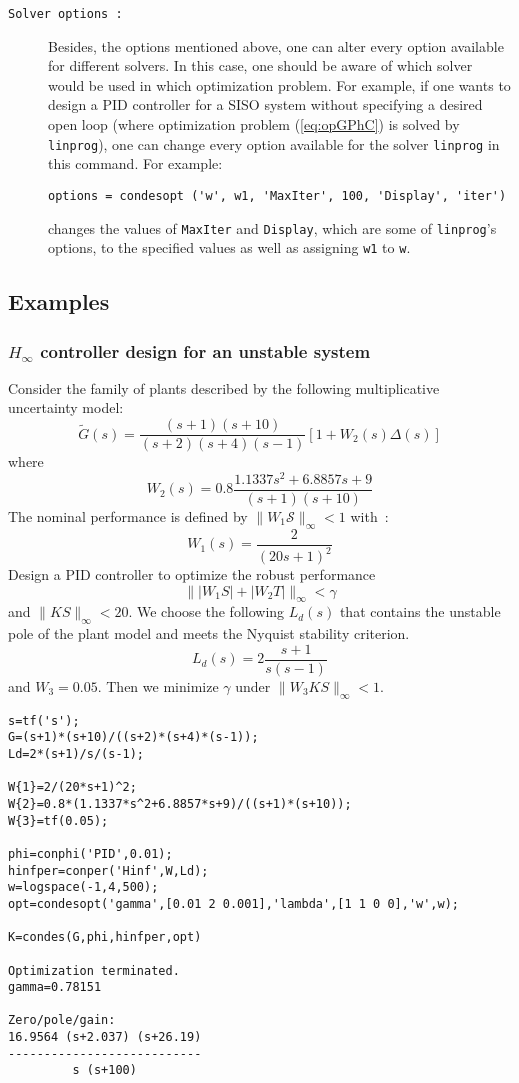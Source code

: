 \documentclass [12pt , a4paper] {report}
\begin{document}
\begin{description}
\item[\texttt{Solver options :}] Besides, the options mentioned above, one can alter every option available for different solvers. In this case, one should be aware of which solver would be used in which optimization problem. For example, if one wants to design a PID controller for a SISO system without specifying a desired open loop (where optimization problem (\ref{eq:opGPhC}) is solved by \texttt{linprog}), one can change every option available for the solver \texttt{linprog} in this command. For example:
\begin{lstlisting}
options = condesopt ('w', w1, 'MaxIter', 100, 'Display', 'iter')
\end{lstlisting}
changes the values of \texttt{MaxIter} and \texttt{Display}, which are some of \texttt{linprog}'s options, to the specified values as well as assigning \texttt{w1} to \texttt{w}.

\end{description}


\subsection{Examples}

\subsubsection{$H_\infty$ controller design for an unstable system}

Consider  the family of plants described by the following multiplicative uncertainty model:
$$
	\tilde{G}(s)=\frac{(s+1)(s+10)}{(s+2)(s+4)(s-1)}[1+ W_2(s)\Delta(s)] 
$$
where 
$$
	W_2(s)=0.8\frac{1.1337s^2+6.8857s+9}{(s+1)(s+10)}
$$
The nominal performance is defined by $\| W_1 \mathcal{S} \|_\infty < 1$ with~: 
$$
	W_1(s)=\frac{2}{(20s+1)^2}
$$
Design a PID controller  to optimize  the robust performance
$$ \| |W_1 S| +  |W_2 T| \|_\infty < \gamma $$
and $\| KS \|_\infty < 20$. We choose the following $L_d(s)$ that contains the unstable pole of the plant model and meets the Nyquist stability criterion.
$$L_d(s)=2 \frac{s+1}{s(s-1)}$$
and $W_3=0.05$. Then we minimize $\gamma$ under $\| W_3 KS \|_\infty < 1$.

\begin{lstlisting}
s=tf('s');
G=(s+1)*(s+10)/((s+2)*(s+4)*(s-1));
Ld=2*(s+1)/s/(s-1);

W{1}=2/(20*s+1)^2;
W{2}=0.8*(1.1337*s^2+6.8857*s+9)/((s+1)*(s+10));
W{3}=tf(0.05);

phi=conphi('PID',0.01);
hinfper=conper('Hinf',W,Ld);
w=logspace(-1,4,500);
opt=condesopt('gamma',[0.01 2 0.001],'lambda',[1 1 0 0],'w',w);

K=condes(G,phi,hinfper,opt)

Optimization terminated.
gamma=0.78151
 
Zero/pole/gain:
16.9564 (s+2.037) (s+26.19)
---------------------------
         s (s+100)
\end{lstlisting}
\end{document}

